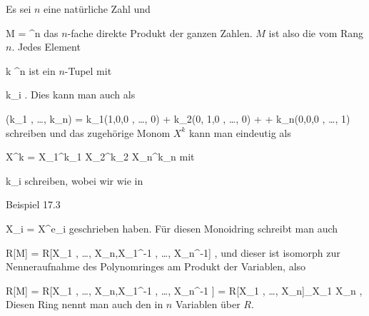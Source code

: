 {





Es sei $n$ eine natürliche Zahl und

\mavergleichskette
{\vergleichskette
{ M
}
{ = }{ \Z^n
}
{  }{
}
{    }{
}
{   }{
}
}
{}{}{}
das $n$-fache direkte Produkt der ganzen Zahlen. $M$ ist also die
vom Rang $n$. Jedes Element

\mavergleichskette
{\vergleichskette
{ k
}
{ \in }{ \Z^n
}
{  }{
}
{    }{
}
{   }{
}
}
{}{}{}
ist ein $n$-Tupel
 mit

\mavergleichskette
{\vergleichskette
{ k_i
}
{ \in }{ \Z
}
{  }{
}
{    }{
}
{   }{
}
}
{}{}{.}
Dies kann man auch  als

\mavergleichskettedisp
{\vergleichskette
{ (k_1 , \ldots , k_n)
}
{ =} { k_1(1,0,0 , \ldots ,   0) + k_2(0, 1,0 , \ldots ,  0) + \cdots +  k_n(0,0,0 , \ldots , 1)
}
{ } {
}
{ } {
}
{ } {
}
}
{}{}{}
schreiben und das zugehörige Monom $X^k$ kann man eindeutig als

\mavergleichskettedisp
{\vergleichskette
{ X^k
}
{ =} { X_1^{k_1 } X_2^{k_2 } \cdots X_n^{k_n }
}
{ } {
}
{ } {
}
{ } {
}
}
{}{}{}
mit

\mavergleichskette
{\vergleichskette
{ k_i
}
{ \in }{ \Z
}
{  }{
}
{    }{
}
{   }{
}
}
{}{}{}
schreiben, wobei wir wie in

Beispiel 17.3


\mavergleichskette
{\vergleichskette
{ X_i
}
{ = }{ X^{e_i }
}
{  }{
}
{    }{
}
{   }{
}
}
{}{}{}
geschrieben haben. Für diesen Monoidring schreibt man auch

\mavergleichskettedisp
{\vergleichskette
{ R[M]
}
{ =} { R[X_1 , \ldots , X_n,X_1^{-1} , \ldots ,  X_n^{-1}]
}
{ } {
}
{ } {
}
{ } {
}
}
{}{}{,}
und dieser ist isomorph zur Nenneraufnahme des Polynomringes am Produkt der Variablen, also

\mavergleichskettedisp
{\vergleichskette
{ R[M]
}
{ =} { R[X_1 , \ldots , X_n,X_1^{-1} , \ldots , X_n^{-1} ]
}
{ =} { R[X_1 , \ldots , X_n]_{X_1 \cdots X_n }
}
{ } {}
{ } {}
}
{}{}{,}
Diesen Ring nennt man auch den
 in $n$ Variablen über $R$.





}










